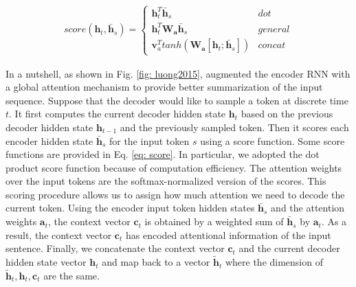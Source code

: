 \small
\begin{align}
    score(\bm{h}_t, \bm{\bar h}_s) =
  \begin{cases}
        \bm{h}_t^T \bm{\bar h}_s & dot \\
        \bm{h}_t^T \bm{W_a} \bm{\bar h}_s & general \\
        \bm{v}_a^T tanh(\bm{W_a} [\bm{h}_t;\bm{\bar h}_s]) & concat 
  \end{cases}
  \label{eq: score}
\end{align}
\normalsize

In a nutshell, as shown in Fig. \ref{fig: luong2015}, \cite{luong2015effective} augmented the encoder RNN with a global attention mechanism to provide better summarization of the input sequence. Suppose that the decoder would like to sample a token at discrete time $t$. It first computes the current decoder hidden state $\bm{h}_t$ based on the previous decoder hidden state $\bm{h}_{t-1}$ and the previously sampled token. Then it scores each encoder hidden state $\bm{\bar h}_s$ for the input token $s$ using a score function. Some score functions are provided in Eq. \ref{eq: score}. In particular, we adopted the dot product score function because of computation efficiency. The attention weights over the input tokens are the softmax-normalized version of the scores. This scoring procedure allows us to assign how much attention we need to decode the current token. Using the encoder input token hidden states $\bm{\bar h}_s$ and the attention weights $\bm{a}_t$, the context vector $\bm{c}_t$ is obtained by a weighted sum of $\bm{\bar h}_s$ by $\bm{a}_t$. As a result, the context vector $\bm{c}_t$ has encoded attentional information of the input sentence. Finally, we concatenate the context vector $\bm{c}_t$ and the current decoder hidden state vector $\bm{h}_t$ and map back to a vector $\bm{\tilde h}_t$ where the dimension of $\bm{\tilde h}_t, \bm{h}_t, \bm{c}_t$ are the same.



